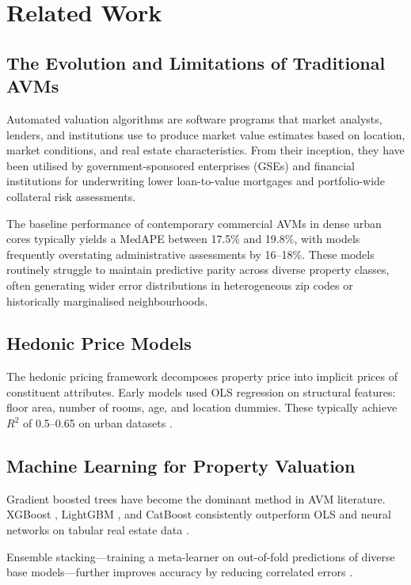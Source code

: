\documentclass[11pt, a4paper, twoside]{article}
\begin{document}
\section{Related Work}
\label{sec:related}

\subsection{The Evolution and Limitations of Traditional AVMs}
Automated valuation algorithms are software programs that market analysts,
lenders, and institutions use to produce market value estimates based on
location, market conditions, and real estate characteristics. From their
inception, they have been utilised by government-sponsored enterprises (GSEs)
and financial institutions for underwriting lower loan-to-value mortgages and
portfolio-wide collateral risk assessments.

The baseline performance of contemporary commercial AVMs in dense urban cores
typically yields a MedAPE between 17.5\% and 19.8\%, with models frequently
overstating administrative assessments by 16--18\%. These models routinely
struggle to maintain predictive parity across diverse property classes, often
generating wider error distributions in heterogeneous zip codes or historically
marginalised neighbourhoods.

\subsection{Hedonic Price Models}
The hedonic pricing framework \cite{rosen1974} decomposes property price into
implicit prices of constituent attributes. Early models used OLS regression on
structural features: floor area, number of rooms, age, and location dummies.
These typically achieve $R^2$ of 0.5--0.65 on urban datasets
\cite{sirmans2005}.

\subsection{Machine Learning for Property Valuation}
Gradient boosted trees have become the dominant method in AVM literature.
XGBoost \cite{chen2016}, LightGBM \cite{ke2017}, and CatBoost
\cite{prokhorenkova2018} consistently outperform OLS and neural networks on
tabular real estate data \cite{phan2018,truong2020}.

Ensemble stacking---training a meta-learner on out-of-fold predictions of
diverse base models---further improves accuracy by reducing correlated errors
\cite{wolpert1992,breiman1996}.
\end{document}
